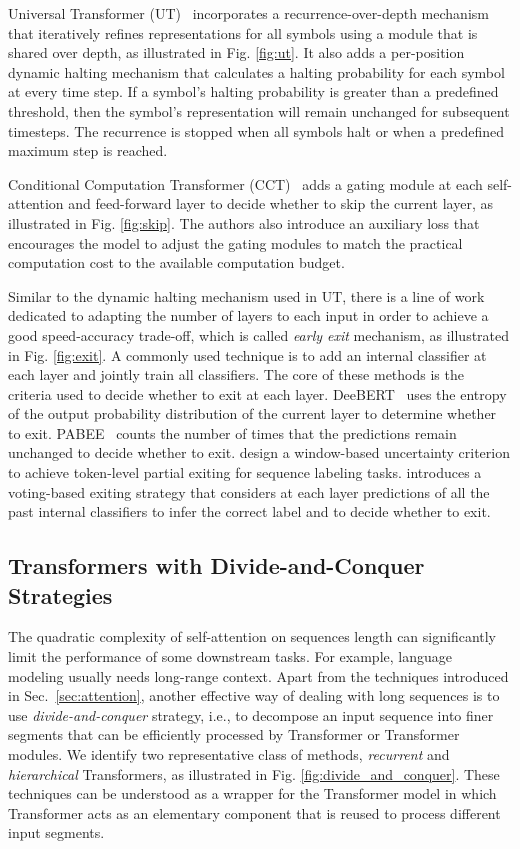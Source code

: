 \documentclass[manuscript,acmsmall,screen,nonacm]{acmart}
\theoremstyle{definition}
\begin{document}
Universal Transformer (UT)~\cite{universalxformer} incorporates a recurrence-over-depth mechanism that iteratively refines representations for all symbols using a module that is shared over depth, as illustrated in Fig. \ref{fig:ut}. It also adds a per-position dynamic halting mechanism that calculates a halting probability for each symbol at every time step. If a symbol's halting probability is greater than a predefined threshold, then the symbol's representation will remain unchanged for subsequent timesteps. The recurrence is stopped when all symbols halt or when a predefined maximum step is reached.

Conditional Computation Transformer (CCT)~\cite{CCTransformer} adds a gating module at each self-attention and feed-forward layer to decide whether to skip the current layer, as illustrated in Fig. \ref{fig:skip}. The authors also introduce an auxiliary loss that encourages the model to adjust the gating modules to match the practical computation cost to the available computation budget.

Similar to the dynamic halting mechanism used in UT, there is a line of work dedicated to adapting the number of layers to each input in order to achieve a good speed-accuracy trade-off, which is called \textit{early exit} mechanism, as illustrated in Fig. \ref{fig:exit}. A commonly used technique is to add an internal classifier at each layer and jointly train all classifiers. The core of these methods is the criteria used to decide whether to exit at each layer. DeeBERT~\cite{xin-etal-2020-deebert} uses the entropy of the output probability distribution of the current layer to determine whether to exit. PABEE~\cite{zhou2020bert} counts the number of times that the predictions remain unchanged to decide whether to exit. \citet{li21accelerating} design a window-based uncertainty criterion to achieve token-level partial exiting for sequence labeling tasks. \citet{sun2021early} introduces a voting-based exiting strategy that considers at each layer predictions of all the past internal classifiers to infer the correct label and to decide whether to exit.

\subsection{Transformers with Divide-and-Conquer Strategies}
The quadratic complexity of self-attention on sequences length can significantly limit the performance
of some downstream tasks. For example, language modeling usually needs long-range context.  Apart from the techniques introduced in Sec.~\ref{sec:attention}, another effective way of dealing with long sequences is to use \textit{divide-and-conquer} strategy, i.e., to decompose an input sequence into finer segments that can be efficiently processed by Transformer or Transformer modules. We identify two representative class of methods, \textit{recurrent} and \textit{hierarchical} Transformers, as illustrated in Fig. \ref{fig:divide_and_conquer}. These techniques can be understood as a wrapper for the Transformer model in which Transformer acts as an elementary component that is reused to process different input segments.
\end{document}
